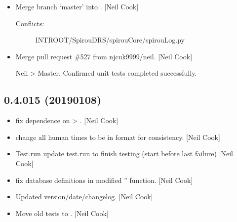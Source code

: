 \documentclass[a4paper,10pt,english]{report}
\begin{document}
\begin{itemize}
\item {} 
Merge branch ‘master’ into . {[}Neil Cook{]}
\begin{description}
\item[{Conflicts:}] \leavevmode
INTROOT/SpirouDRS/spirouCore/spirouLog.py

\end{description}

\item {} 
Merge pull request \#527 from njcuk9999/neil. {[}Neil Cook{]}

Neil \textendash{}\textgreater{} Master. Confirmed unit tests completed successfully.

\end{itemize}


\subsection{0.4.015 (2019\sphinxhyphen{}01\sphinxhyphen{}08)}
\label{\detokenize{misc/changelog:id241}}\begin{itemize}
\item {} 
 \sphinxhyphen{} fix dependence on  \textendash{}\textgreater{} .
{[}Neil Cook{]}

\item {} 
 \sphinxhyphen{} change all human times to be in format
 for consistency. {[}Neil Cook{]}

\item {} 
Test.run \sphinxhyphen{} update test.run to finish testing (start before last
failure) {[}Neil Cook{]}

\item {} 
 \sphinxhyphen{} fix database definitions in modified ”
function. {[}Neil Cook{]}

\item {} 
Updated version/date/changelog. {[}Neil Cook{]}

\item {} 
Move old tests to . {[}Neil Cook{]}

\end{itemize}
\end{document}
